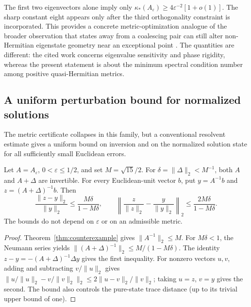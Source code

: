 \begin{remark}
The first two eigenvectors alone imply only
$\kappa_*(A_\varepsilon)\geq4\varepsilon^{-2}[1+o(1)]$.
The sharp constant eight appears only after the third orthogonality constraint
is incorporated.  This provides a concrete metric-optimization analogue of the
broader observation that states away from a coalescing pair can still alter
non-Hermitian eigenstate geometry near an exceptional point
\cite{Schomerus2024}.  The quantities are different: the cited work concerns
eigenvalue sensitivity and phase rigidity, whereas the present statement is
about the minimum spectral condition number among positive quasi-Hermitian
metrics.
\end{remark}

\subsection{A uniform perturbation bound for normalized solutions}
The metric certificate collapses in this family, but a conventional
resolvent estimate gives a uniform bound on inversion and on the
normalized solution state for all sufficiently small Euclidean errors.

\begin{proposition}
\label{prop:uniform_state}
Let $A=A_\varepsilon$, $0<\varepsilon\leq1/2$, and set
$M=\sqrt{15}/2$. For $\delta=\|\Delta\|_2<M^{-1}$, both $A$ and
$A+\Delta$ are invertible. For every Euclidean-unit vector $b$, put
$y=A^{-1}b$ and $z=(A+\Delta)^{-1}b$. Then
\begin{equation}\label{eq:uniform_state}
 \frac{\|z-y\|_2}{\|y\|_2}
 \leq\frac{M\delta}{1-M\delta},\qquad
 \left\|\frac{z}{\|z\|_2}-\frac{y}{\|y\|_2}\right\|_2
 \leq\frac{2M\delta}{1-M\delta}.
\end{equation}
The bounds do not depend on $\varepsilon$ or on an admissible metric.
\end{proposition}
\begin{proof}
Theorem~\ref{thm:counterexample} gives $\|A^{-1}\|_2\leq M$.
For $M\delta<1$, the Neumann series yields
$\|(A+\Delta)^{-1}\|_2\leq M/(1-M\delta)$.
The identity $z-y=-(A+\Delta)^{-1}\Delta y$ gives the first
inequality. For nonzero vectors $u,v$, adding and subtracting
$v/\|u\|_2$ gives
$\|u/\|u\|_2-v/\|v\|_2\|_2
\leq2\|u-v\|_2/\|v\|_2$; taking $u=z$, $v=y$
gives the second. The bound also controls the pure-state trace distance
(up to its trivial upper bound of one).
\end{proof}
